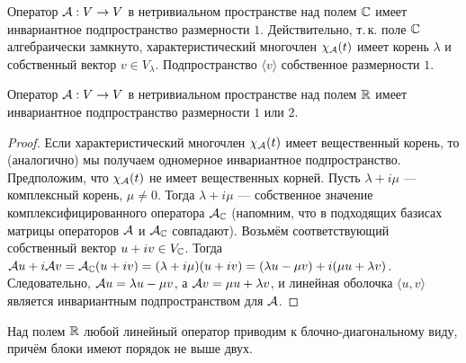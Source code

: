 Оператор $\mathcal{A}: V \to V$ в нетривиальном пространстве над полем $\mathbb{C}$ имеет инвариантное подпространство размерности $1$. Действительно, т.\,к. поле $\mathbb{C}$ алгебраически замкнуто, характеристический многочлен $\chi_{\mathcal{A}}(t)$ имеет корень $\lambda$ и собственный вектор $v \in V_\lambda$. Подпространство $\langle v\rangle$ собственное размерности $1$.

\begin{theorem}
    Оператор $\mathcal{A}: V \to V$ в нетривиальном пространстве над полем $\mathbb{R}$ имеет инвариантное подпространство размерности $1$ или $2$.
\end{theorem}

\begin{proof}
    Если характеристический многочлен $\chi_{\mathcal{A}}(t)$ имеет вещественный корень, то (аналогично) мы получаем одномерное инвариантное подпространство. Предположим, что $\chi_{\mathcal{A}}(t)$ не имеет вещественных корней. Пусть $\lambda + i\mu$ --- комплексный корень, $\mu \ne 0$. Тогда $\lambda + i\mu$ --- собственное значение комплексифицированного оператора $\mathcal{A}_{\mathbb{C}}$ (напомним, что в подходящих базисах матрицы операторов $\mathcal{A}$ и $\mathcal{A}_{\mathbb{C}}$ совпадают). Возьмём соответствующий собственный вектор $u + iv \in V_{\mathbb{C}}$. Тогда $\mathcal{A} u + i\mathcal{A} v = \mathcal{A}_{\mathbb{C}}(u + iv) = (\lambda + i\mu)(u + iv) = (\lambda u - \mu v) + i(\mu u + \lambda v)$. Следовательно, $\mathcal{A} u = \lambda u - \mu v$, а $\mathcal{A} v = \mu u + \lambda v$, и линейная оболочка $\langle u, v\rangle$ является инвариантным подпространством для $\mathcal{A}$.
\end{proof}

\begin{corollary}
    Над полем $\mathbb{R}$ любой линейный оператор приводим к блочно-диагональному виду, причём блоки имеют порядок не выше двух.
\end{corollary}

